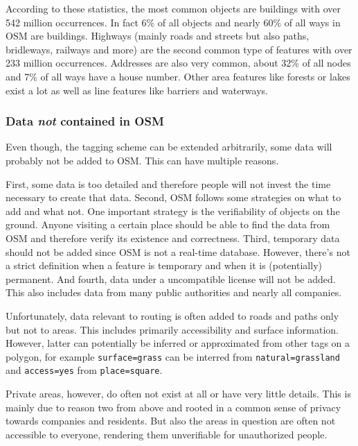 			According to these statistics, the most common objects are buildings with over 542 million occurrences.
			In fact 6\% of all objects and nearly 60\% of all ways in OSM are buildings.
			Highways (mainly roads and streets but also paths, bridleways, railways and more) are the second common type of features with over 233 million occurrences.
			Addresses are also very common, about 32\% of all nodes and 7\% of all ways have a house number.
			Other area features like forests or lakes exist a lot as well as line features like barriers and waterways.
			
		\subsubsection{Data \textit{not} contained in OSM}
		
			Even though, the tagging scheme can be extended arbitrarily, some data will probably not be added to OSM.
			This can have multiple reasons.
			
			First, some data is too detailed and therefore people will not invest the time necessary to create that data.
			Second, OSM follows some strategies on what to add and what not.
			One important strategy is the verifiability of objects on the ground.
			Anyone visiting a certain place should be able to find the data from OSM and therefore verify its existence and correctness.
			Third, temporary data should not be added since OSM is not a real-time database.
			However, there's not a strict definition when a feature is temporary and when it is (potentially) permanent.
			And fourth, data under a uncompatible license will not be added.
			This also includes data from many public authorities and nearly all companies.
			
			Unfortunately, data relevant to routing is often added to roads and paths only but not to areas.
			This includes primarily accessibility and surface information.
			However, latter can potentially be inferred or approximated from other tags on a polygon, for example \texttt{surface=grass} can be interred from \texttt{natural=grassland} and \texttt{access=yes} from \texttt{place=square}.
			
			Private areas, however, do often not exist at all or have very little details.
			This is mainly due to reason two from above and rooted in a common sense of privacy towards companies and residents.
			But also the areas in question are often not accessible to everyone, rendering them unverifiable for unauthorized people.
			
